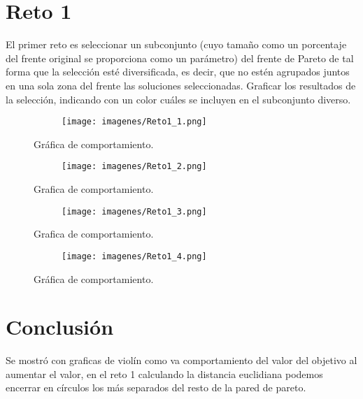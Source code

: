 \documentclass{article}
\begin{document}
\newpage
\section{Reto 1}
El primer reto es seleccionar un subconjunto (cuyo tamaño como un porcentaje del frente original se proporciona como un parámetro) del frente de Pareto de tal forma que la selección esté diversificada, es decir, que no estén agrupados juntos en una sola zona del frente las soluciones seleccionadas. Graficar los resultados de la selección, indicando con un color cuáles se incluyen en el subconjunto diverso.



\begin{figure}[H]
\centering
\begin{subfigure}[b]{1.0\linewidth}
\texttt{[image: imagenes/Reto1\_1.png]}
\end{subfigure}
\caption{Gráfica de comportamiento.}
\label{fig:westminster}
\end{figure}


\begin{figure}[H]
\centering
\begin{subfigure}[b]{1.0\linewidth}
\texttt{[image: imagenes/Reto1\_2.png]}
\end{subfigure}
\caption{Grafica de comportamiento.}
\label{fig:westminster}
\end{figure}



\begin{figure}[H]
\centering
\begin{subfigure}[b]{1.0\linewidth}
\texttt{[image: imagenes/Reto1\_3.png]}
\end{subfigure}
\caption{Grafica de comportamiento.}
\label{fig:westminster}
\end{figure}
\begin{figure}[H]
\centering
\begin{subfigure}[b]{1.0\linewidth}
\texttt{[image: imagenes/Reto1\_4.png]}
\end{subfigure}
\caption{Gráfica de comportamiento.}
\label{fig:westminster}
\end{figure}





 \section{Conclusión}
Se mostró con graficas de violín como va comportamiento del valor del objetivo al aumentar el valor, en el reto 1 calculando la distancia euclidiana podemos encerrar en círculos los más separados del resto de la pared de pareto.  

 
 

 
\end{document}
